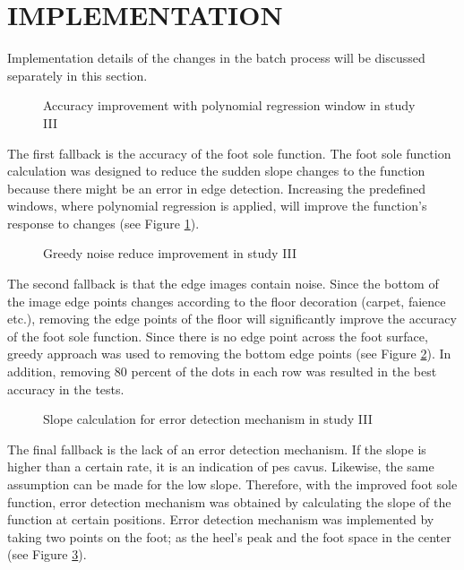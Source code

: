 \section{IMPLEMENTATION}\label{sec:StudyIIIImplementation}

Implementation details of the changes in the batch process will be discussed separately in this section.

\begin{figure}[htbp]
\centering
{}
\caption{Accuracy improvement with polynomial regression window in study III}
\label{fig:StudyIIIPredefinedWindows}
\end{figure}

The first fallback is the accuracy of the foot sole function. The foot sole function calculation was designed to reduce the sudden slope changes to the function because there might be an error in edge detection. Increasing the predefined windows, where polynomial regression is applied, will improve the function’s response to changes (see Figure \ref{fig:StudyIIIPredefinedWindows}).

\begin{figure}[htbp]
\centering
{}
\caption{Greedy noise reduce improvement in study III}
\label{fig:StudyIIINoiseReduce}
\end{figure}

The second fallback is that the edge images contain noise. Since the bottom of the image edge points changes according to the floor decoration (carpet, faience etc.), removing the edge points of the floor will significantly improve the accuracy of the foot sole function. Since there is no edge point across the foot surface, greedy approach was used to removing the bottom edge points (see Figure \ref{fig:StudyIIINoiseReduce}). In addition, removing 80 percent of the dots in each row was resulted in the best accuracy in the tests.

\begin{figure}[htbp]
\centering
{}
\caption{Slope calculation for error detection mechanism  in study III}
\label{fig:StudyIIISlopeCalculation}
\end{figure}

The final fallback is the lack of an error detection mechanism. If the slope is higher than a certain rate, it is an indication of pes cavus. Likewise, the same assumption can be made for the low slope. Therefore, with the improved foot sole function, error detection mechanism was obtained by calculating the slope of the function at certain positions. Error detection mechanism was implemented by taking two points on the foot; as the heel's peak and the foot space in the center (see Figure \ref{fig:StudyIIISlopeCalculation}).

